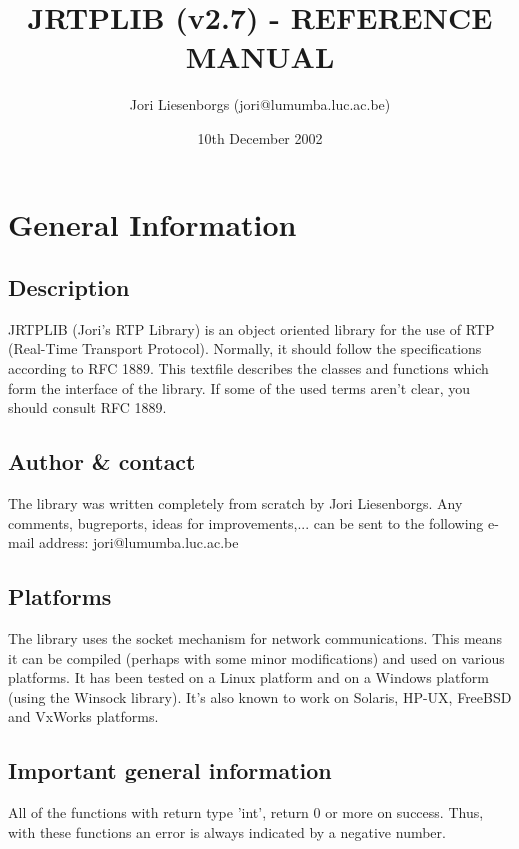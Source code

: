 

\title{JRTPLIB (v2.7) -  REFERENCE MANUAL}
\author{Jori Liesenborgs (jori@lumumba.luc.ac.be)}
\date{10th December 2002}
\maketitle


\section{General Information}

\subsection{Description}

JRTPLIB (Jori's RTP Library) is an object oriented library for the use of RTP
(Real-Time Transport Protocol). Normally, it should follow the specifications
according to RFC 1889. This textfile describes the classes and functions 
which form the interface of the library. If some of the used terms aren't
clear, you should consult RFC 1889.

\subsection{Author \& contact}

The library was written completely from scratch by Jori Liesenborgs. Any
comments, bugreports, ideas for improvements,... can be sent to the following
e-mail address:	
	jori@lumumba.luc.ac.be

\subsection{Platforms}

The library uses the socket mechanism for network communications. This means
it can be compiled (perhaps with some minor modifications) and used on 
various platforms. It has been tested on a Linux platform and on a Windows
platform (using the Winsock library). It's also known to work on Solaris,
HP-UX, FreeBSD and VxWorks platforms.

\subsection{Important general information}

All of the functions with return type 'int', return 0 or more on success. 
Thus, with these functions an error is always indicated by a negative number.


